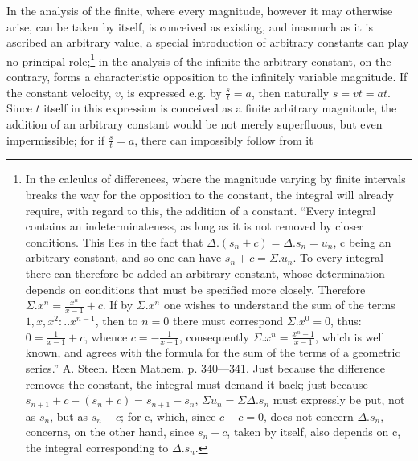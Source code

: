 \documentclass[12pt,a4paper,openany]{book}
\newcommand{\opage}[1]{\marginnote{\footnotesize\textit{[#1]}}}
\begin{document}
In the analysis of the finite, where every magnitude, however
it may otherwise arise, can be taken by itself, is conceived
as existing, and inasmuch as it is ascribed an arbitrary
value, a special introduction of arbitrary constants
can play no principal role;\footnote[1]{In the calculus of differences, where the magnitude varying by finite intervals breaks the way for the opposition to the constant, the integral will already require, with regard to this, the addition of a constant. ``Every integral contains an indeterminateness, as long as it is not removed by closer conditions. This lies in the fact that $\Delta.(s_{n}+c)=\Delta.s_{n}=u_{n}$, c being an arbitrary constant, and so one can have $s_{n}+c=\Sigma.u_{n}$. To every integral there can therefore be added an arbitrary constant, whose determination depends on conditions that must be specified more closely. Therefore $\Sigma.x^{n}=\frac{x^{n}}{x-1}+c$. If by $\Sigma.x^{n}$ one wishes to understand the sum of the terms $1, x, x^{2}:..x^{n-1}$, then to $n=0$ there must correspond $\Sigma.x^{0}=0$, thus: $0=\frac{1}{x-1}+c$, whence $c=-\frac{1}{x-1}$, consequently $\Sigma.x^{n}=\frac{x^{n}-1}{x-1}$, which is well known, and agrees with the formula for the sum of the terms of a geometric series.'' A. Steen. Reen Mathem. p. 340—341. Just because the difference removes the constant, the integral must demand it back; just because $s_{n+1}+c-(s_{n}+c)=s_{n+1}-s_{n}$, $\Sigma u_{n}=\Sigma\Delta.s_{n}$ must expressly be put, not as $s_{n}$, but as $s_{n}+c$; for c, which, since $c-c=0$, does not concern $\Delta.s_{n}$, concerns, on the other hand, since $s_{n}+c$, taken by itself, also depends on c, the integral corresponding to $\Delta.s_{n}$.} in the analysis of the infinite
the arbitrary constant, on the contrary, forms a characteristic
opposition to the infinitely variable magnitude. If the constant velocity, $v$, is expressed
\setcounter{footnote}{0}%
\opage{113}e.g. by $\frac{s}{t}=a$, then
naturally $s=vt=at$. Since $t$ itself in this expression is conceived as a finite arbitrary magnitude, the addition of
an arbitrary constant would be not merely superfluous, but even
impermissible; for if $\frac{s}{t}=a$, there can impossibly follow from it
\end{document}
